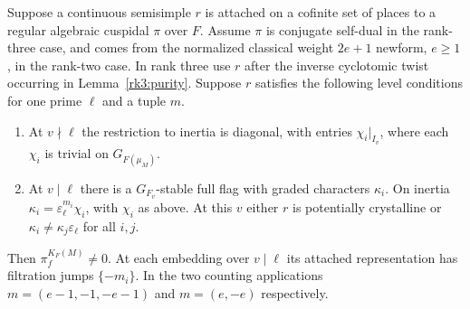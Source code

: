 \begin{proposition}\label{newgal:level}
Suppose a continuous semisimple $r$ is attached on a cofinite set of
places to a regular algebraic cuspidal $\pi$ over $F$. Assume $\pi$
is conjugate self-dual in the rank-three case, and comes from the
normalized classical weight $2e+1$ newform, $e\ge1$, in the rank-two
case. In rank three use $r$ after the inverse cyclotomic twist occurring
in Lemma~\ref{rk3:purity}. Suppose $r$ satisfies the following level
conditions for one prime $\ell$ and a tuple $m$.
\begin{enumerate}
\item At $v\nmid\ell$ the restriction to inertia is diagonal, with entries
$\chi_i|_{I_v}$, where each $\chi_i$ is trivial on $G_{F(\mu_M)}$.
\item At $v\mid\ell$ there is a $G_{F_v}$-stable full flag with graded
characters $\kappa_i$. On inertia $\kappa_i=\varepsilon_\ell^{m_i}\chi_i$,
with $\chi_i$ as above. At this $v$ either $r$ is potentially crystalline
or $\kappa_i\ne\kappa_j\varepsilon_\ell$ for all $i,j$.
\end{enumerate}
Then $\pi_f^{K_F(M)}\ne0$. At each embedding over $v\mid\ell$ its
attached representation has filtration jumps $\{-m_i\}$. In the two
counting applications $m=(e-1,-1,-e-1)$ and $m=(e,-e)$ respectively.
\end{proposition}
